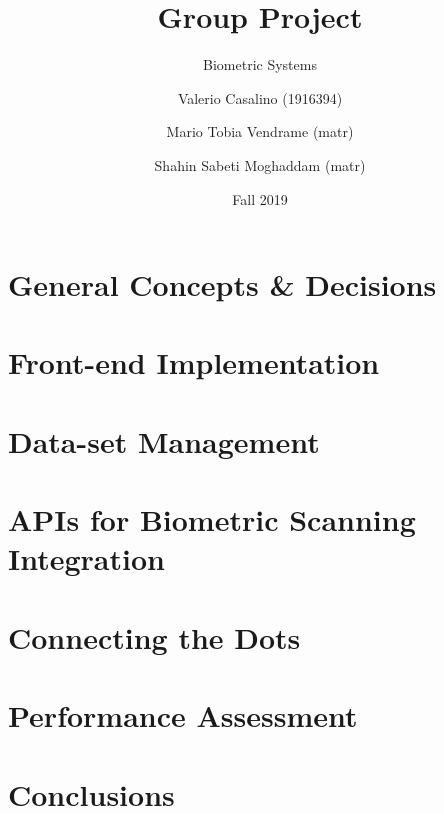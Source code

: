 \documentclass[t]{beamer}
\title
{
\LARGE Group Project
}
\subtitle
{
Biometric Systems
}
\author[Casalino, Vendrame, Moghaddam] 
{
    Valerio Casalino (1916394)\inst{1} \and 
    Mario Tobia Vendrame (matr)\inst{1} \and
    Shahin Sabeti Moghaddam (matr)\inst{1}    
}
\institute
{
\inst{1}
{\color{black} Cybersecurity Master @ Sapienza Università di Roma}
}
\date{
Fall 2019
}
\begin{document}
	
	\frame{\titlepage}

	\section{General Concepts \& Decisions}
	
	\section{Front-end Implementation}

	\section{Data-set Management}
	
	

	\section{APIs for Biometric Scanning Integration}
	
	\section{Connecting the Dots}
	
	\section{Performance Assessment}
	
	\section{Conclusions}
\end{document}
